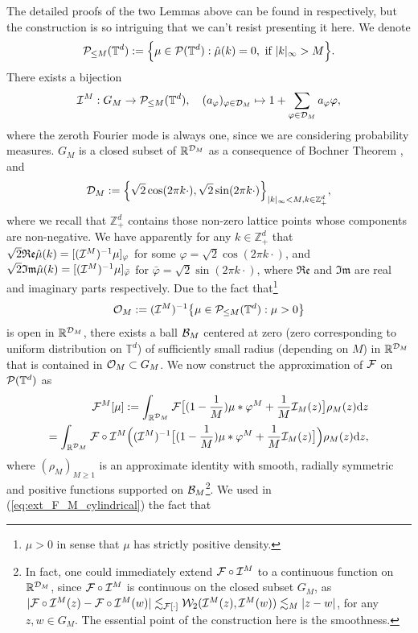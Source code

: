 The detailed proofs of the two Lemmas above can be found in \cite[Lemma 3.3 \& Section A.3.2]{djurdjevac2025weak} respectively, but the construction is so intriguing that we can't resist presenting it here. We denote 
\[
\mathcal{P}_{\leq M}(\mathbb{T}^d) := \Big\{\mu \in \mathcal{P}(\mathbb{T}^d): \hat{\mu}(k) = 0, \ \text{if} \ |k|_{\infty} > M\Big\}. 
\]
There exists a bijection 
\[
\mathcal{I}^M : G_M \to \mathcal{P}_{\leq M}(\mathbb{T}^d), \quad (a_{\varphi})_{\varphi \in \mathcal{D}_M} \mapsto 1 + \sum_{\varphi \in \mathcal{D}_M}a_{\varphi} \varphi,
\]
where the zeroth Fourier mode is always one, since we are considering probability measures. $G_M$ is a closed subset of $\mathbb{R}^{\mathcal{D}_M}$ as a consequence of Bochner Theorem \cite{B33}, and 
\[
\mathcal{D}_M := \Big\{\sqrt{2}\cos(2\pi k \cdot ), \sqrt{2}\sin(2\pi k \cdot )\Big\}_{|k|_{\infty} < M, k \in \mathbb{Z}^d_+},
\]
where we recall that $\mathbb{Z}^d_+$ contains those non-zero lattice points whose components are non-negative. 
We have apparently for any $k \in \mathbb{Z}^d_+$ that $\sqrt{2}\mathfrak{Re}\hat{\mu}(k) = [(\mathcal{I}^M)^{-1}\mu]_\varphi$ for some $\varphi = \sqrt{2}\cos(2\pi k \cdot )$, and $\sqrt{2}\mathfrak{Im}\hat{\mu}(k) = [(\mathcal{I}^M)^{-1}\mu]_{\bar{\varphi}}$ for $\bar{\varphi} = \sqrt{2}\sin(2\pi k \cdot )$, where $\mathfrak{Re}$ and $\mathfrak{Im}$ are real and imaginary parts respectively.  Due to the fact that\footnote{$\mu > 0$ in sense that $\mu$ has strictly positive density. } 
\[
\mathcal{O}_M := (\mathcal{I}^M)^{-1}\big\{ \mu \in \mathcal{P}_{\leq M}(\mathbb{T}^d): \mu > 0\big\} 
\]
 is open in $\mathbb{R}^{\mathcal{D}_M}$, there exists a ball $\mathcal{B}_M$ centered at zero (zero corresponding to uniform distribution on $\mathbb{T}^d$) of sufficiently small radius (depending on $M$) in $\mathbb{R}^{\mathcal{D}_M}$ that is contained in $\mathcal{O}_M \subset G_M$. We now construct the approximation of $\mathcal{F}$ on $\mathcal{P}(\mathbb{T}^d)$ as 
 \begin{equation}\label{eq:ext_F_M_cylindrical}
 \begin{split}
 \mathcal{F}^{M}[\mu] := \int_{\mathbb{R}^{\mathcal{D}_M}} \mathcal{F}\big[(1 - \frac{1}{M}) \mu \ast \varphi^M + \frac{1}{M}\mathcal{I}_M(z)\big]\rho_M(z)\mathrm{d}z\\
 =  \int_{\mathbb{R}^{\mathcal{D}_M}} \mathcal{F}\circ \mathcal{I}^M \Big((\mathcal{I}^M)^{-1}\big[(1 - \frac{1}{M}) \mu \ast \varphi^M + \frac{1}{M}\mathcal{I}_M(z)\big]\Big)\rho_M(z)\mathrm{d}z, 
 \end{split}
 \end{equation}
 where $(\rho_M)_{M \geq 1}$ is an approximate identity with smooth, radially symmetric and positive functions supported on $\mathcal{B}_M$\footnote{In fact, one could immediately extend $\mathcal{F}\circ \mathcal{I}^M$ to a continuous function on $\mathbb{R}^{\mathcal{D}_M}$, since $\mathcal{F}\circ \mathcal{I}^M$ is continuous on the closed subset $G_M$, as $| \mathcal{F}\circ \mathcal{I}^M(z) -   \mathcal{F}\circ \mathcal{I}^M(w)| \lesssim_{\mathcal{F}[\cdot]} \mathcal{W}_2(\mathcal{I}^M(z), \mathcal{I}^M(w)) \lesssim_M |z - w|$, for any $z, w \in G_M$. The essential point of the construction here is the smoothness.}. We used in (\ref{eq:ext_F_M_cylindrical}) the fact that 
